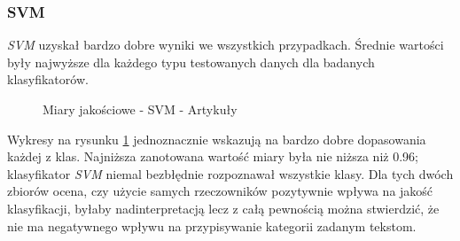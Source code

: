 \subsubsection{SVM}
\textit{SVM} uzyskał bardzo dobre wyniki we wszystkich przypadkach. Średnie wartości były najwyższe dla każdego typu testowanych danych dla badanych klasyfikatorów. 
\begin{figure}[ht!]
	\centering
    \qquad
	\caption{Miary jakościowe - SVM - Artykuły}
    \label{fig:report-svm-articles}
\end{figure}

Wykresy na rysunku \ref{fig:report-svm-articles} jednoznacznie wskazują na bardzo dobre dopasowania każdej z klas. Najniższa zanotowana wartość miary była nie niższa niż 0.96; klasyfikator \textit{SVM} niemal bezbłędnie rozpoznawał wszystkie klasy. Dla tych dwóch zbiorów ocena, czy użycie samych rzeczowników pozytywnie wpływa na jakość klasyfikacji, byłaby nadinterpretacją lecz z całą pewnością można stwierdzić, że nie ma negatywnego wpływu na przypisywanie kategorii zadanym tekstom.  

